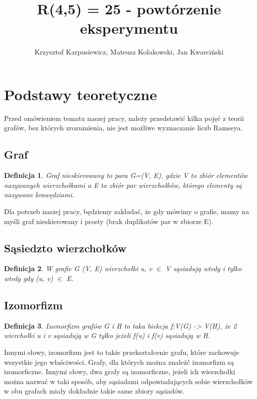 \documentclass[11pt]{article}
\title{R(4,5) = 25 - powtórzenie eksperymentu}
\author{Krzysztof Karpusiewicz, Mateusz Kołakowski, Jan Kwarciński}
\newtheorem{definition}{Definicja}[section]
\begin{document}
\tableofcontents
\pagebreak

\section{Podstawy teoretyczne}

  Przed omówieniem tematu naszej pracy, należy przedstawić kilka pojęć z teorii grafów, bez których zrozumienia, nie jest możliwe wyznaczanie liczb Ramseya.

  \subsection{Graf}
  \begin{definition}
    Graf nieskierowany to para G=(V, E), gdzie V to zbiór elementów nazywanych wierzchołkami a E to zbiór par wierzchołków, którego elementy są nazywane krawędziami.
  \end{definition}

  Dla potrzeb naszej pracy, będziemy zakładać, że gdy mówimy o grafie, mamy na myśli graf nieskierowany i prosty (brak duplikatów par w zbiorze E).
  
  \subsection{Sąsiedzto wierzchołków}
  \begin{definition}
    W grafie G (V, E) wierzchołki u, v $\in$ V sąsiadują wtedy i tylko wtedy gdy (u, v) $\in$ E.    
  \end{definition}

  \subsection{Izomorfizm}

  \begin{definition}
    Izomorfizm grafów G i H to taka biekcja f:V(G) -> V(H), że 2 wierchołki u i v sąsiadują w G tylko jeżeli f(u) i f(v) sąsiadują w H.
  \end{definition}

  Innymi słowy, izomorfizm jest to takie przekształcenie grafu, które zachowuje wszystkie jego właściwości. Grafy, dla których można znaleźć izomorfizm są izomorficzne. Innymi słowy, dwa grafy są izomorficzne, jeżeli ich wierzchołki można nazwać w taki sposób, 
  aby sąsiadami odpowiadających sobie wierzchołków w obu grafach miały dokładnie takie same zbiory sąsiadów.
  \begin{figure}[h]
    \centering
    \caption{}
  \end{figure}
\end{document}
